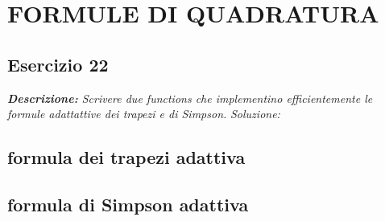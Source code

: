 \chapter{FORMULE DI QUADRATURA}
\section{Esercizio 22}
\textit{\textbf{Descrizione:}  Scrivere due functions che implementino efficientemente le formule adattattive dei trapezi e di Simpson.}\newline
\noindent\emph{Soluzione: }\newline

\section*{formula dei trapezi adattiva}

\newpage

\section*{formula di Simpson adattiva}

\newpage